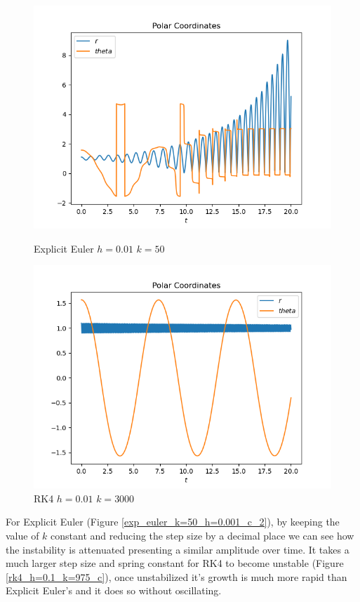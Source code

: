 \documentclass{scrartcl}
\newcounter{constant}
\begin{document}
\begin{figure}[h]
\centering
\begin{minipage}[b]{0.45\textwidth}
\centering
\includegraphics[width=\textwidth]{../Plots/ExpEuler/exp_euler_k=50_h=0.01_c}
\caption{Explicit Euler $h=0.01$ $k=50$}
\label{exp_euler_k=50_h=0.01_c}
\end{minipage}
\hfill
\begin{minipage}[b]{0.45\textwidth}
\centering
\includegraphics[width=\textwidth]{../Plots/RK4/rk4_h=0.01_k=3000_c}
\caption{RK4 $h=0.01$ $k=3000$}
\label{rk4_h=0.01_k=3000_c}
\end{minipage}
\end{figure}
	
For Explicit Euler (Figure \ref{exp_euler_k=50_h=0.001_c_2}), by keeping the value of $k$ constant and reducing the step size by a decimal place we can see how the instability is attenuated presenting a similar amplitude over time.
It takes a much larger step size and spring constant for RK4 to become unstable (Figure \ref{rk4_h=0.1_k=975_c}), once unstabilized it’s growth is much more rapid than Explicit Euler’s and it does so without oscillating.
\end{document}
